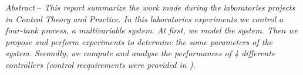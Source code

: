 \begin{bfseries}
\emph{Abstract} -- 
\emph{
This report summarize the work made during the laboratories projects in \emph{Control Theory and Practice}.
In this laboratories experiments we control a four-tank process, a multivariable system.
At first, we model the system. 
Then we propose and perform experiments to determine the some parameters of the system.
Secondly, we compute and analyse the performances of 4 differents controllers (control recquirements were provided in \cite{subject}). 
}
\end{bfseries}
